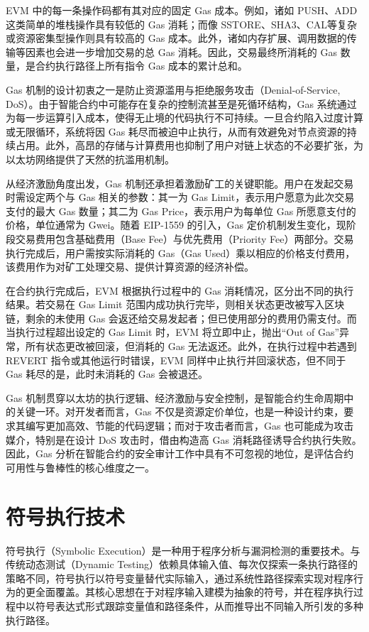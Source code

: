 \documentclass[print, master, vlined, timesmath]{DissertUESTC}
\begin{document}
EVM 中的每一条操作码都有其对应的固定 Gas 成本。例如，诸如 PUSH、ADD 这类简单的堆栈操作具有较低的 Gas 消耗；而像 SSTORE、SHA3、CAL等复杂或资源密集型操作则具有较高的 Gas 成本。此外，诸如内存扩展、调用数据的传输等因素也会进一步增加交易的总 Gas 消耗。因此，交易最终所消耗的 Gas 数量，是合约执行路径上所有指令 Gas 成本的累计总和。

Gas 机制的设计初衷之一是防止资源滥用与拒绝服务攻击（Denial-of-Service, DoS）。由于智能合约中可能存在复杂的控制流甚至是死循环结构，Gas 系统通过为每一步运算引入成本，使得无止境的代码执行不可持续。一旦合约陷入过度计算或无限循环，系统将因 Gas 耗尽而被迫中止执行，从而有效避免对节点资源的持续占用。此外，高昂的存储与计算费用也抑制了用户对链上状态的不必要扩张，为以太坊网络提供了天然的抗滥用机制。

从经济激励角度出发，Gas 机制还承担着激励矿工的关键职能。用户在发起交易时需设定两个与 Gas 相关的参数：其一为 Gas Limit，表示用户愿意为此次交易支付的最大 Gas 数量；其二为 Gas Price，表示用户为每单位 Gas 所愿意支付的价格，单位通常为 Gwei。随着 EIP-1559 的引入，Gas 定价机制发生变化，现阶段交易费用包含基础费用（Base Fee）与优先费用（Priority Fee）两部分。交易执行完成后，用户需按实际消耗的 Gas（Gas Used）乘以相应的价格支付费用，该费用作为对矿工处理交易、提供计算资源的经济补偿。

在合约执行完成后，EVM 根据执行过程中的 Gas 消耗情况，区分出不同的执行结果。若交易在 Gas Limit 范围内成功执行完毕，则相关状态更改被写入区块链，剩余的未使用 Gas 会返还给交易发起者；但已使用部分的费用仍需支付。而当执行过程超出设定的 Gas Limit 时，EVM 将立即中止，抛出“Out of Gas”异常，所有状态更改被回滚，但消耗的 Gas 无法返还。此外，在执行过程中若遇到 REVERT 指令或其他运行时错误，EVM 同样中止执行并回滚状态，但不同于 Gas 耗尽的是，此时未消耗的 Gas 会被退还。

Gas 机制贯穿以太坊的执行逻辑、经济激励与安全控制，是智能合约生命周期中的关键一环。对开发者而言，Gas 不仅是资源定价单位，也是一种设计约束，要求其编写更加高效、节能的代码逻辑；而对于攻击者而言，Gas 也可能成为攻击媒介，特别是在设计 DoS 攻击时，借由构造高 Gas 消耗路径诱导合约执行失败。因此，Gas 分析在智能合约的安全审计工作中具有不可忽视的地位，是评估合约可用性与鲁棒性的核心维度之一。




\section{符号执行技术}

符号执行（Symbolic Execution）是一种用于程序分析与漏洞检测的重要技术。与传统动态测试（Dynamic Testing）依赖具体输入值、每次仅探索一条执行路径的策略不同，符号执行以符号变量替代实际输入，通过系统性路径探索实现对程序行为的更全面覆盖。其核心思想在于对程序输入建模为抽象的符号，并在程序执行过程中以符号表达式形式跟踪变量值和路径条件，从而推导出不同输入所引发的多种执行路径。
\end{document}
